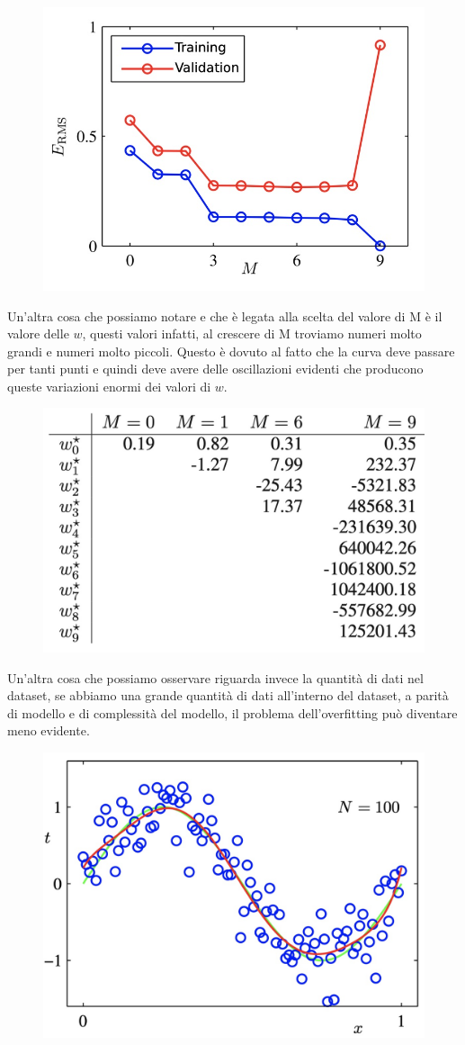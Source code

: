 \documentclass[14pt]{extreport}
\begin{document}
\begin{figure}[H]
	\centering
	\includegraphics[width=0.5\linewidth]{84.jpeg}
\end{figure}

Un'altra cosa che possiamo notare e che è legata alla scelta del valore di M è il valore delle $w$, questi valori infatti, al crescere di M troviamo
numeri molto grandi e numeri molto piccoli. Questo è dovuto al fatto che la curva deve passare per tanti punti e quindi deve avere delle oscillazioni
evidenti che producono queste variazioni enormi dei valori di $w$.

\begin{figure}[H]
	\centering
	\includegraphics[width=0.4\linewidth]{85.jpeg}
\end{figure}

Un'altra cosa che possiamo osservare riguarda invece la quantità di dati nel dataset, se abbiamo una grande quantità di dati all'interno del dataset,
a parità di modello e di complessità del modello, il problema dell'overfitting può diventare meno evidente.


\begin{figure}[H]
	\centering
	\includegraphics[width=0.4\linewidth]{86.jpeg}
\end{figure}
\end{document}
